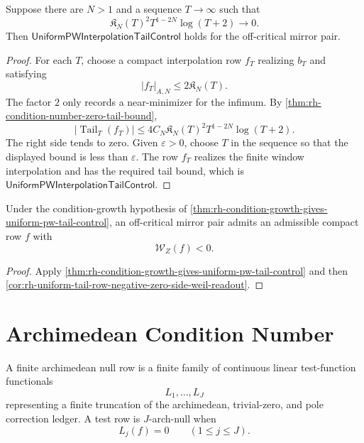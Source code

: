 \begin{theorem}
\label{thm:rh-condition-growth-gives-uniform-pw-tail-control}
Suppose there are $N>1$ and a sequence $T\to\infty$ such that
$$
\mathfrak K_N(T)^2T^{1-2N}\log(T+2)\to0.
$$
Then $\mathsf{UniformPWInterpolationTailControl}$ holds for the
off-critical mirror pair.
\end{theorem}

\begin{proof}
For each $T$, choose a compact interpolation row $f_T$ realizing $b_T$
and satisfying
$$
|f_T|_{A,N}\le2\mathfrak K_N(T).
$$
The factor $2$ only records a near-minimizer for the infimum.  By
\autoref{thm:rh-condition-number-zero-tail-bound},
$$
|\operatorname{Tail}_T(f_T)|
\le
4C_N\mathfrak K_N(T)^2T^{1-2N}\log(T+2).
$$
The right side tends to zero.  Given $\varepsilon>0$, choose $T$ in the
sequence so that the displayed bound is less than $\varepsilon$.  The
row $f_T$ realizes the finite window interpolation and has the required
tail bound, which is
$\mathsf{UniformPWInterpolationTailControl}$.
\end{proof}

\begin{corollary}
\label{cor:rh-condition-growth-negative-zero-side-readout}
Under the condition-growth hypothesis of
\autoref{thm:rh-condition-growth-gives-uniform-pw-tail-control}, an
off-critical mirror pair admits an admissible compact row $f$ with
$$
\mathcal W_Z(f)<0.
$$
\end{corollary}

\begin{proof}
Apply
\autoref{thm:rh-condition-growth-gives-uniform-pw-tail-control} and then
\autoref{cor:rh-uniform-tail-row-negative-zero-side-weil-readout}.
\end{proof}

\section{Archimedean Condition Number}
\label{sec:rh-archimedean-condition-number}

\begin{definition}
\label{def:rh-finite-archimedean-null-row}
A finite archimedean null row is a finite family of continuous linear
test-function functionals
$$
L_1,\ldots,L_J
$$
representing a finite truncation of the archimedean, trivial-zero, and
pole correction ledger.  A test row is $J$-arch-null when
$$
L_j(f)=0
\qquad
(1\le j\le J).
$$
\end{definition}

